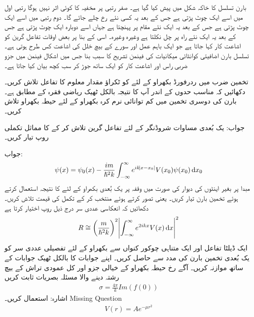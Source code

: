 بارن تسلسل کا خاکہ شکل   میں پیش کیا گیا ہے۔ صفر رتبی  پر مخفیہ کا کوئی اثر نہیں ہوگا رتبی اول میں اسے ایک چوٹ پڑتی ہے جس کے بعد یہ کسی نئے رخ چلے جائے گا۔ دوم رتبی میں اسے ایک چوٹ پڑتی ہے جس کے بعد یہ ایک نئے مقام پر پہنچتا ہے جہاں اسے دوبارہ ایک چوٹ پڑتی ہے جس کے بعد یہ ایک نئے راہ پر چل نکلتا ہے وغیرہ وغیرہ۔ اسی کے بنا پر بعض اوقات تفاعل گرین کو اشاعت کار کہا جاتا ہے جو ایک باہم عمل اور سورے کے بیچ خلل کی اشاعت کس طرح ہوتی ہے۔ تسلسل بارن اضافیتی کوانٹائی میکانیات کی فینمن تشریح کا سبب بنا جس میں اشکال فینمن میں جزو ضربی راس  اور اشاعت کار  کو ایک   ساتھ جوڑ کر سب کچھ بیان کیا جاتا ہے۔

تخمین ضرب میں ردرفورڈ بکھراو کے لئے  کو ٹکراؤ مقدار معلوم کا تفاعل تلاش کریں۔ دکھائیں کہ مناسب حدوں کے اندر آپ کا نتیجہ بالکل  ٹھیک ریاضی فقرہ  کے مطابق ہے۔
بارن کی دوسری تخمین میں کم توانائی نرم کرہ بکھراو کے لئے حیطہ بکھراو تلاش کریں۔

جواب: 
یک بُعدی مساوات شروڈنگر کے لئے تفاعل گرین تلاش کر کے  کا مماثل تکملی روپ تیار کریں۔

جواب:
\begin{align}
	\psi(x)=\psi_0(x)-\frac{im}{\hslash^2k}\int_{-\infty}^{\infty}e^{ik\abs{x-x_0}}V(x_0)\psi(x_0)\dif x_0
\end{align}
مبدا پر بغیر اینٹوں کی دیوار کی صورت میں وقفہ  پر یک بُعدی بکھراو کے لئے  کا نتیجہ استعمال کرتے ہوئے تخمین بارن تیار کریں۔ یعنی  تصور کرتے ہوئے  منتخب کر کے تکمل کی قیمت تلاش کریں۔ دکھائیں کہ انعکاسی عددی سر درج ذیل روپ اختیار کرتا ہے
\begin{align}
	R\cong\left(\frac{m}{\hslash^2k}\right)^2\abs{\int_{-\infty}^{\infty}e^{2ikx}V(x)\dif x}^2
\end{align}
ایک ڈیلٹا تفاعل  اور ایک متناہی چوکور کنواں  سے بکھراو کے لئے تفصیلی عددی سر  کو یک بُعدی تخمین بارن  کی مدد سے حاصل کریں۔ اپنے جوابات کا بالکل  ٹھیک جوابات  کے ساتھ موازنہ کریں۔
آگے رخ حیطہ بکھراو کے خیالی جزو اور کل عمودی تراش کے بیچ رشتہ دینے والا مسئلہ بصریات ثابت کریں 
\begin{align}
	\sigma = \frac{4\pi}{k}Im(f(0))
\end{align}
اشارہ:  استعمال کریں۔
Missing Question
\begin{align}
	V(r) = Ae^{-\mu r^2}
\end{align}

